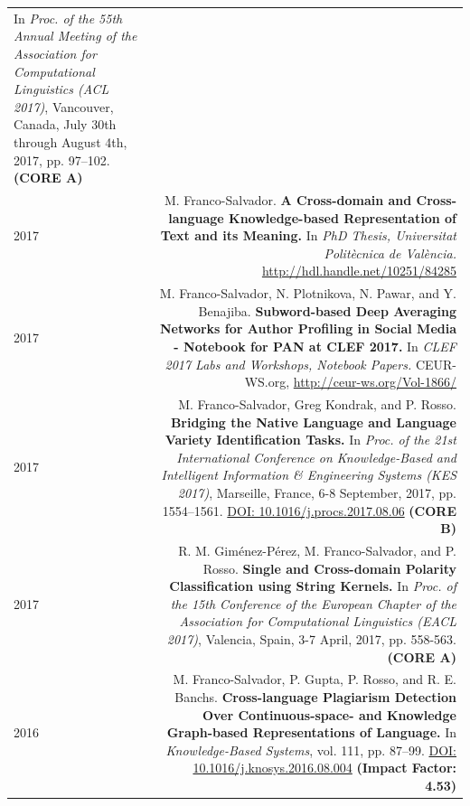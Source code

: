 \documentclass[10pt]{article}
\begin{document}
\begin{tabular}{L!{\VRule}R}
	In \emph{Proc. of the 55th Annual Meeting of the Association for Computational Linguistics (ACL 2017)},  Vancouver, Canada, July 30th through August 4th, 2017, pp. 97--102. \textbf{(CORE A)}\vspace{5pt}\\
	2017& M. Franco-Salvador. \textbf{A Cross-domain and Cross-language Knowledge-based Representation of Text and its Meaning.}
	In \emph{PhD Thesis, Universitat Polit{\`e}cnica de Val{\`e}ncia.} \href{http://hdl.handle.net/10251/84285}{http://hdl.handle.net/10251/84285}\vspace{5pt}\\
	2017& M. Franco-Salvador, N. Plotnikova, N. Pawar, and Y. Benajiba. \textbf{Subword-based Deep Averaging Networks for Author Profiling in Social Media - Notebook for PAN at CLEF 2017.}
	In \emph{CLEF 2017 Labs and Workshops, Notebook Papers.} CEUR-WS.org, \href{http://ceur-ws.org/Vol-1866/}{http://ceur-ws.org/Vol-1866/}\vspace{5pt}\\
	2017&M. Franco-Salvador, Greg Kondrak, and P. Rosso. \textbf{Bridging the Native Language and Language Variety Identification Tasks.}
	In \emph{Proc. of the 21st International Conference on Knowledge-Based and Intelligent Information \& Engineering Systems (KES 2017)}, Marseille, France, 6-8 September, 2017, pp. 1554--1561. \href{https://doi.org/10.1016/j.procs.2017.08.068}{DOI: 10.1016/j.procs.2017.08.06} \textbf{(CORE B)}\vspace{5pt}\\
	2017&R. M. Gim{\'e}nez-P{\'e}rez, M. Franco-Salvador, and P. Rosso. \textbf{Single and Cross-domain Polarity Classification using String Kernels.}
	In \emph{Proc. of the 15th Conference of the European Chapter of the Association for Computational Linguistics (EACL 2017)}, Valencia, Spain, 3-7 April, 2017, pp. 558-563. \textbf{(CORE A)}\vspace{5pt}\\
	2016&M. Franco-Salvador, P. Gupta, P. Rosso, and R. E. Banchs. \textbf{Cross-language Plagiarism Detection Over Continuous-space- and Knowledge Graph-based Representations of Language.}
	In \emph{Knowledge-Based Systems}, vol. 111, pp. 87--99. \href{http://dx.doi.org/10.1016/j.knosys.2016.08.004}{DOI: 10.1016/j.knosys.2016.08.004} \textbf{(Impact Factor: 4.53)} \vspace{5pt}\\
\end{tabular}
\end{document}
